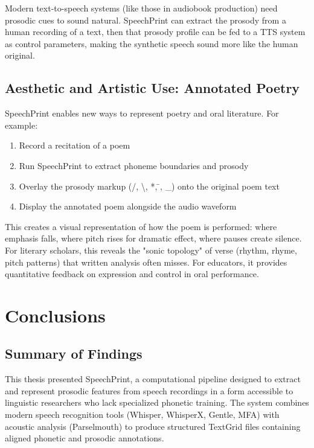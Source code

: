 Modern text-to-speech systems (like those in audiobook production) need prosodic cues to sound natural. SpeechPrint can extract the prosody from a human recording of a text, then that prosody profile can be fed to a TTS system as control parameters, making the synthetic speech sound more like the human original.

\subsection{Aesthetic and Artistic Use: Annotated Poetry}

SpeechPrint enables new ways to represent poetry and oral literature. For example:

\begin{enumerate}
\item Record a recitation of a poem
\item Run SpeechPrint to extract phoneme boundaries and prosody
\item Overlay the prosody markup (/, \textbackslash, *, \={}, \_) onto the original poem text
\item Display the annotated poem alongside the audio waveform
\end{enumerate}

This creates a visual representation of how the poem is performed: where emphasis falls, where pitch rises for dramatic effect, where pauses create silence. For literary scholars, this reveals the "sonic topology" of verse (rhythm, rhyme, pitch patterns) that written analysis often misses. For educators, it provides quantitative feedback on expression and control in oral performance.

\section{Conclusions}
\label{ch:conclusions}

\subsection{Summary of Findings}

This thesis presented SpeechPrint, a computational pipeline designed to extract and represent prosodic features from speech recordings in a form accessible to linguistic researchers who lack specialized phonetic training. The system combines modern speech recognition tools (Whisper, WhisperX, Gentle, MFA) with acoustic analysis (Parselmouth) to produce structured TextGrid files containing aligned phonetic and prosodic annotations.


